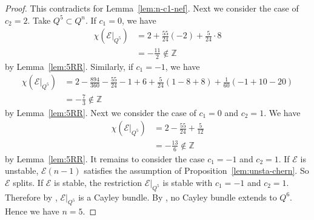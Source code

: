 \documentclass{amsproc}
\theoremstyle{definition}
\def\Z{{\mathbb Z}}
\def\cE{{\mathcal E}}
\begin{document}
\begin{proof}
This contradicts for Lemma~\ref{lem:n-c1-nef}. Next we consider the case of $c_2=2$. Take $Q^5 \subset Q^n$. If $c_1=0$,  we have 
\begin{align*}
\chi(\cE|_{Q^5})&=2+\frac{55}{24}(-2)+\frac{5}{24}\cdot 8\\
&= -\frac{11}{2}\notin \Z
\end{align*}
by Lemma~\ref{lem:5RR}. Similarly, if $c_1=-1$, we have
\begin{align*}
\chi(\cE|_{Q^5})&=2 -\frac{894}{360} -\frac{55}{24}-1+6+\frac{5}{24}(1-8+8)+\frac{1}{60}(-1+10-20)\\
&= -\frac{7}{3}\notin \Z
\end{align*}
by Lemma~\ref{lem:5RR}. Next we consider the case of $c_1=0$ and $c_2=1$. We have
\begin{align*}
\chi(\cE|_{Q^5})&=2 -\frac{55}{24}+\frac{5}{12}\\
&= -\frac{13}{6}\notin \Z
\end{align*}
by Lemma~\ref{lem:5RR}. It remains to consider the case $c_1=-1$ and $c_2=1$. If $\cE$ is unstable, $\cE(n-1)$ satisfies the assumption of Proposition~\ref{lem:unsta-chern}. So $\cE$ splits. If $\cE$ is stable, the restriction $\cE|_{Q^5}$ is stable with $c_1=-1$ and $c_2=1$. Therefore by \cite[Main~Theorem(i)]{O90}, $\cE|_{Q^5}$ is a Cayley bundle. By \cite[Theorem~3.2]{O90}, no Cayley bundle extends to $Q^6$. Hence we have $n=5$. 
\end{proof}
\end{document}

